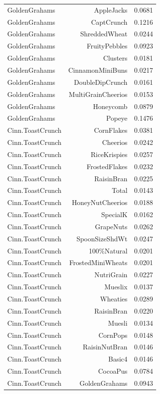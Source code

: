 \begin{longtable}{@{}lrr@{}}
GoldenGrahams & AppleJacks & 0.0681 \\
GoldenGrahams & CaptCrunch & 0.1216 \\
GoldenGrahams & ShreddedWheat & 0.0244 \\
GoldenGrahams & FruityPebbles & 0.0923 \\
GoldenGrahams & Clusters & 0.0181 \\
GoldenGrahams & CinnamonMiniBuns & 0.0217 \\
GoldenGrahams & DoubleDipCrunch & 0.0161 \\
GoldenGrahams & MultiGrainCheerios & 0.0153 \\
GoldenGrahams & Honeycomb & 0.0879 \\
GoldenGrahams & Popeye & 0.1476 \\
Cinn.ToastCrunch & CornFlakes & 0.0381 \\
Cinn.ToastCrunch & Cheerios & 0.0242 \\
Cinn.ToastCrunch & RiceKrispies & 0.0257 \\
Cinn.ToastCrunch & FrostedFlakes & 0.0232 \\
Cinn.ToastCrunch & RaisinBran & 0.0225 \\
Cinn.ToastCrunch & Total & 0.0143 \\
Cinn.ToastCrunch & HoneyNutCheerios & 0.0188 \\
Cinn.ToastCrunch & SpecialK & 0.0162 \\
Cinn.ToastCrunch & GrapeNuts & 0.0262 \\
Cinn.ToastCrunch & SpoonSizeShdWt & 0.0247 \\
Cinn.ToastCrunch & 100\%Natural & 0.0201 \\
Cinn.ToastCrunch & FrostedMiniWheats & 0.0201 \\
Cinn.ToastCrunch & NutriGrain & 0.0227 \\
Cinn.ToastCrunch & Mueslix & 0.0137 \\
Cinn.ToastCrunch & Wheaties & 0.0289 \\
Cinn.ToastCrunch & RaisinBran & 0.0220 \\
Cinn.ToastCrunch & Muesli & 0.0134 \\
Cinn.ToastCrunch & CornPops & 0.0148 \\
Cinn.ToastCrunch & RaisinNutBran & 0.0146 \\
Cinn.ToastCrunch & Basic4 & 0.0146 \\
Cinn.ToastCrunch & CocoaPus & 0.0784 \\
Cinn.ToastCrunch & GoldenGrahams & 0.0943 \\

\end{longtable}
